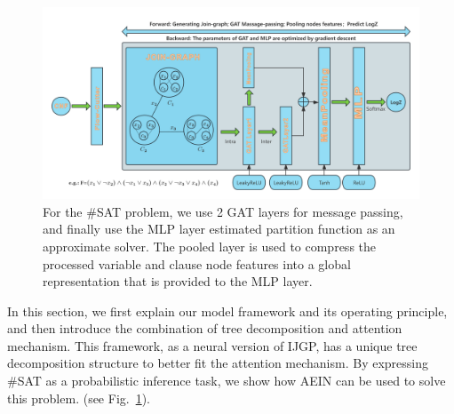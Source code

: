 \begin{figure}[h]
\centering 
\includegraphics[width=1\textwidth]{png/AEIN2.png}
\caption{For the \#SAT problem, we use 2 GAT layers for message passing, and finally use the MLP 
layer estimated partition function as an approximate solver. The pooled layer is used to compress 
the processed variable and clause node features into a global representation that is provided to 
the MLP layer.} 
\label{fig1}
\end{figure}
In this section, we first explain our model framework and its operating principle, and then introduce 
the combination of tree decomposition and attention mechanism. This framework, as a neural version of 
IJGP, has a unique tree decomposition structure to better fit the attention mechanism. By expressing 
\#SAT as a probabilistic inference task, we show how AEIN can be used to solve this problem. (see Fig.~\ref{fig1}).

